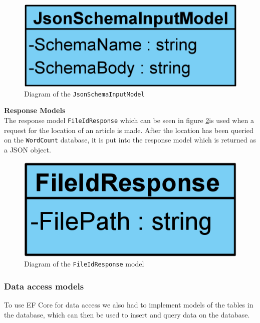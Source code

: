 \begin{figure}[H]
    \centering
    \includegraphics[scale=0.25]{Images/JsonSchemaInputModel.png}
    \caption{Diagram of the \texttt{JsonSchemaInputModel}}
    \label{JsonSchemaInputModel}
\end{figure}

\textbf{Response Models}\\
The response model \texttt{FileIdResponse} which can be seen in figure \ref*{FileIdResponse}is used when a request for the location of an article is made. After the location has been queried on the \texttt{WordCount} database, it is put into the response model which is returned as a JSON object.

\begin{figure}[H]
    \centering
    \includegraphics[scale=0.25]{Images/FileIdResponse.png}
    \caption{Diagram of the \texttt{FileIdResponse} model}
    \label{FileIdResponse}
\end{figure}

\subsubsection*{Data access models}
To use EF Core for data access we also had to implement models of the tables in the database, which can then be used to insert and query data on the database.


